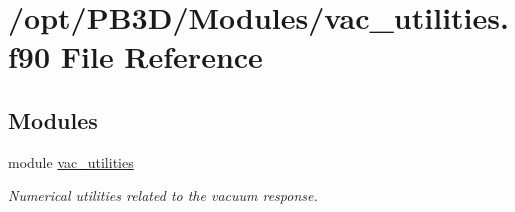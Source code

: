 \hypertarget{vac__utilities_8f90}{}\section{/opt/\+P\+B3\+D/\+Modules/vac\+\_\+utilities.f90 File Reference}
\label{vac__utilities_8f90}
\subsection*{Modules}
\begin{DoxyCompactItemize}
\item 
module \hyperlink{namespacevac__utilities}{vac\+\_\+utilities}
\begin{DoxyCompactList}\small\item\em Numerical utilities related to the vacuum response. \end{DoxyCompactList}\end{DoxyCompactItemize}
